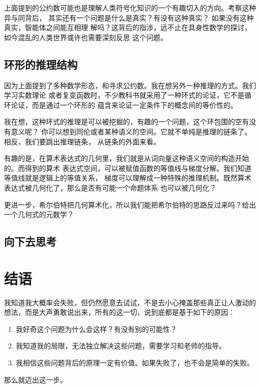 \documentclass[a4paper,12pt]{article}
\numberwithin{problem}{section}
\numberwithin{definition}{section}
\numberwithin{lemma}{section}
\numberwithin{proposition}{section}
\numberwithin{theorem}{section}
\numberwithin{grammar}{section}
\numberwithin{program}{section}
\numberwithin{convention}{section}
\numberwithin{corollary}{section}
\begin{document}
上面提到的公约数可能也是理解人类符号化知识的一个有趣切入的方向。考察这种异与同背后，
其实还有一个问题是什么是真实？有没有这种真实？ 如果没有这种真实，智能体之间能互相理
解吗？这背后的指涉，远不止在具身性数学的探讨，如今混乱的人类世界或许也需要深刻反思
这个问题。

\subsection{环形的推理结构}

因为上面提到了多种数学形态，和寻求公约数。我在想另外一种推理的方式。我们学习实数理论
或者复变函数时，不少教科书就采用了一种环式的论证，它不是循环论证，而是通过一个环形的
蕴含来论证一定条件下的概念间的等价性的。

我在想，这种环式的推理是可以被挖掘的，有趣的一个问题，这个环包围的空有没有意义呢？
你可以想到同伦或者某种语义的空间。它就不单纯是推理的链条了。相反，我们要跳出推理链条，
从链条的外面来看。

有趣的是，在算术表达式的几何里，我们就是从词向量这种语义空间的构造开始的。而得到的算术
表达式空间，可以被赋值函数的等值线与梯度分解。我们知道等值线就是逻辑上的等值关系，
梯度可以理解成一种特殊的推理机制。既然算术表达式被几何化了，那么是否有可能一个命题体系
也可以被几何化？

更进一步，希尔伯特把几何算术化，所以我们能把希尔伯特的思路反过来吗？给出一个几何式的元数学？

\subsection{向下去思考}

\newpage

\section{结语}

我知道我大概率会失败，但仍然愿意去试试，不是去小心掩盖那些真正让人激动的想法，而是大声勇敢说出来，所有的这一切，说到底都是基于如下的原因：
\begin{enumerate}
    \item 我好奇这个问题为什么会这样？有没有别的可能性？
    \item 我知道我的局限，无法独立解决这些问题，需要学习和老师的指导。
    \item 我相信这些问题背后的原理一定有价值。如果失败了，也不会是简单的失败。
\end{enumerate}

那么就迈出这一步。
\end{document}
